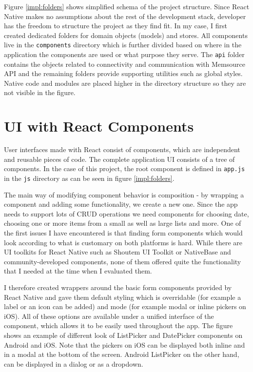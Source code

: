 Figure \ref{impl:folders} shows simplified schema of the project structure. Since React Native makes no assumptions about the rest of the development stack, developer has the freedom to structure the project as they find fit. In my case, I first created dedicated folders for domain objects (models) and stores. All components live in the \texttt{components} directory which is further divided based on where in the application the components are used or what purpose they serve. The \texttt{api} folder contains the objects related to connectivity and communication with Memsource API and the remaining folders provide supporting utilities such as global styles. Native code and modules are placed higher in the directory structure so they are not visible in the figure.


\section{UI with React Components}

User interfaces made with React consist of components, which are independent and reusable pieces of code. The complete application UI consists of a tree of components. In the case of this project, the root component is defined in \texttt{app.js} in the \texttt{js} directory as can be seen in figure \ref{impl:folders}.

The main way of modifying component behavior is composition - by wrapping a component and adding some functionality, we create a new one. Since the app needs to support lots of CRUD operations we need components for choosing date, choosing one or more items from a small as well as large lists and more. One of the first issues I have encountered is that finding form components which would look according to what is customary on both platforms is hard. While there are UI toolkits for React Native such as Shoutem UI Toolkit or NativeBase and community-developed components, none of them offered quite the functionality that I needed at the time when I evaluated them.

I therefore created wrappers around the basic form components provided by React Native and gave them default styling which is overridable (for example a label or an icon can be added) and mode (for example modal or inline pickers on iOS). All of these options are available under a unified interface of the component, which allows it to be easily used throughout the app. The figure shows an example of different look of ListPicker and DatePicker components on Android and iOS. Note that the pickers on iOS can be displayed both inline and in a modal at the bottom of the screen. Android ListPicker on the other hand, can be displayed in a dialog or as a dropdown.

